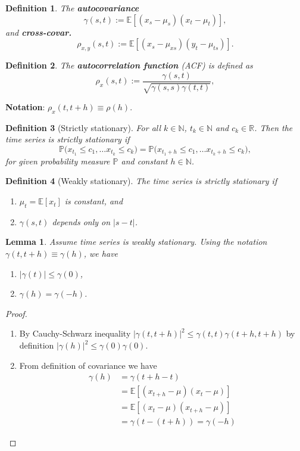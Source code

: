 \documentclass[10pt]{article}
\theoremstyle{remark}
\theoremstyle{plain}
\newtheorem{Lemma}{Lemma}[section]
\newtheorem{Definition}{Definition}[section]
\newcommand{\R}{\mathbb{R}}
\newcommand{\N}{\mathbb{N}}
\numberwithin{equation}{section}
\renewcommand{\leq}{\leqslant}
\begin{document}
\begin{Definition}
	The \textbf{autocovariance} $$\gamma (s,t) := \mathds{E} \left[(x_s - \mu_s) (x_t-\mu_t)\right],$$ and \textbf{cross-covar.} $$\rho_{x,y}(s,t):= \mathds{E}\left[(x_s - \mu_{xs})(y_t - \mu_{ts})\right].$$
\end{Definition}

\begin{Definition}
	The \textbf{autocorrelation function} (ACF) is defined as
	\[
	\rho_{x} (s,t)  := \frac{\gamma(s,t)}{\sqrt{\gamma(s,s)\gamma(t,t)}},
	\]
\end{Definition}

\textbf{Notation}: $\rho_{x}(t, t+h)  \equiv \rho(h)$.

\begin{Definition}[Strictly stationary]
	For all $k \in \N$, $t_k \in \N$ and $c_k \in \R$. Then the time series is strictly stationary if
	\[
	\mathds{P} \big(x_{t_1} \leq c_1, \dots x_{t_k} \leq c_k \big) = \mathds{P} \big(x_{t_1+h} \leq c_1, \dots x_{t_k+h} \leq c_k \big),
	\]
	for given probability measure $\mathds{P}$ and constant $h \in \N$.
\end{Definition}


\begin{Definition}[Weakly stationary]
	The time series is strictly stationary if
	\begin{enumerate}
		\item $\mu_t = \mathds{E}[x_t]$ is constant, and
		
		\item $\gamma(s,t)$ depends only on $|s-t|$. 
	\end{enumerate}
\end{Definition}


\begin{Lemma}
	Assume time series is weakly stationary. Using the notation $\gamma (t, t+h) \equiv \gamma (h)$, we have
	\begin{enumerate}
		\item $|\gamma (t)| \leq \gamma(0)$,
		
		\item $\gamma(h) = \gamma(-h)$.
	\end{enumerate}
\end{Lemma}

\begin{proof}
	\begin{enumerate}
		\item By Cauchy-Schwarz inequality $|\gamma (t, t+h)|^2 \leq \gamma(t,t) \gamma(t+h,t+h)$ by definition $|\gamma(h)|^2 \leq \gamma(0) \gamma(0)$.
		
		\item From definition of covariance we have
		\begin{align*} 
			\gamma(h) &= \gamma(t+h-t)\\
			& = \mathds{E}\left[(x_{t+h}-\mu)(x_t - \mu)\right]\\
			& = \mathds{E}\left[(x_t - \mu)(x_{t+h}-\mu)\right]\\
			& = \gamma(t-(t+h)) = \gamma(-h)
		\end{align*}
	\end{enumerate}
\end{proof}
\end{document}
